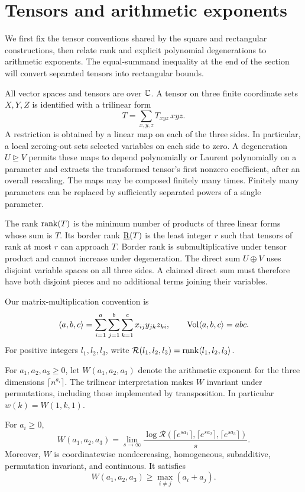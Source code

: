 \section{Tensors and arithmetic exponents}\label{sec:preliminaries}

We first fix the tensor conventions shared by the square and rectangular
constructions, then relate rank and explicit polynomial degenerations to
arithmetic exponents.  The equal-summand inequality at the end of the
section will convert separated tensors into rectangular bounds.

All vector spaces and tensors are over \(\mathbb C\).  A tensor on three finite
coordinate sets \(X,Y,Z\) is identified with a trilinear form
\[
 T=\sum_{x,y,z}T_{xyz}\,x y z.
\]
A restriction is obtained by a linear map on each of the three sides.
In particular, a local zeroing-out sets selected variables on each side
to zero.  A degeneration \(U\unrhd V\) permits these maps to depend
polynomially or Laurent polynomially on a parameter and extracts the
transformed tensor's first nonzero coefficient, after an overall rescaling.
The maps may be composed finitely many times.
Finitely many parameters can be replaced by sufficiently separated powers
of a single parameter.

The rank \(\operatorname{rank}(T)\) is the minimum number of products of three linear
forms whose sum is \(T\).  Its border rank \(\operatorname{\underline R}(T)\) is the least
integer \(r\) such that tensors of rank at most \(r\) can approach
\(T\).  Border rank is submultiplicative under tensor product and cannot
increase under degeneration.  The direct sum \(U\oplus V\) uses
disjoint variable spaces on all three sides.  A claimed direct sum must
therefore have both disjoint pieces and no additional terms joining their
variables.

Our matrix-multiplication convention is
\[
 \langle a,b,c\rangle
 =\sum_{i=1}^{a}\sum_{j=1}^{b}\sum_{k=1}^{c}x_{ij}y_{jk}z_{ki},
 \qquad \operatorname{Vol}\langle a,b,c\rangle=abc.
\]
For positive integers \(l_1,l_2,l_3\), write
\(\mathcal R(l_1,l_2,l_3)=\operatorname{rank}\langle l_1,l_2,l_3\rangle\).

For \(a_1,a_2,a_3\ge0\), let \(W(a_1,a_2,a_3)\) denote the arithmetic
exponent for the three dimensions \(\lceil n^{a_i}\rceil\).
The trilinear interpretation makes \(W\) invariant under permutations,
including those implemented by transposition.
In particular \(w(k)=W(1,k,1)\).

\begin{lemma}\label{lem:rank-exponent}
For \(a_i\ge0\),
\begin{equation}\label{eq:rank-exponent}
 W(a_1,a_2,a_3)=
 \lim_{s\to\infty}\frac{\log\mathcal R
   (\lceil e^{sa_1}\rceil,\lceil e^{sa_2}\rceil,
          \lceil e^{sa_3}\rceil)}{s}.
\end{equation}
Moreover, \(W\) is coordinatewise nondecreasing, homogeneous,
subadditive, permutation invariant, and continuous.  It satisfies
\[
 W(a_1,a_2,a_3)\ge\max_{i\ne j}(a_i+a_j).
\]
\end{lemma}

